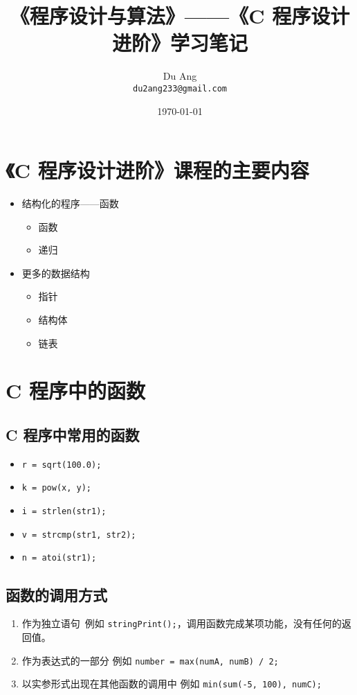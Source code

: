 \documentclass[UTF8]{ctexart}
\title{\heiti 《程序设计与算法》——《C 程序设计进阶》学习笔记}
\author{\kaishu Du Ang \\ \texttt{du2ang233@gmail.com} }
\date{\today}
\begin{document}
\maketitle

\section{《C 程序设计进阶》课程的主要内容}
\begin{itemize}
    \item 结构化的程序——函数
    \begin{itemize}
        \item 函数
        \item 递归
    \end{itemize}

    \item 更多的数据结构
    \begin{itemize}
        \item 指针
        \item 结构体
        \item 链表
    \end{itemize}
\end{itemize}

\section{C 程序中的函数}
\subsection{C 程序中常用的函数}
\begin{itemize}
    \item \texttt{r = sqrt(100.0);}
    \item \texttt{k = pow(x, y);}
    \item \texttt{i = strlen(str1);}
    \item \texttt{v = strcmp(str1, str2);}
    \item \texttt{n = atoi(str1);}
\end{itemize}

\subsection{函数的调用方式}
\begin{enumerate}
    \item 作为独立语句\
    例如 \texttt{stringPrint();}，调用函数完成某项功能，没有任何的返回值。
    \item 作为表达式的一部分
    例如 \texttt{number = max(numA, numB) / 2;}
    \item 以实参形式出现在其他函数的调用中
    例如 \texttt{min(sum(-5, 100), numC);}
\end{enumerate}
\end{document}
